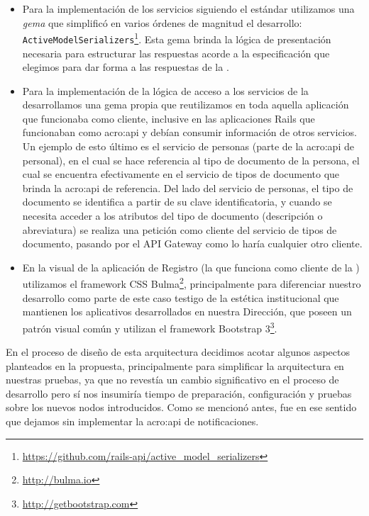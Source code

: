 \begin{itemize}
  \item Para la implementación de los servicios siguiendo el estándar  utilizamos una \textit{gema} que simplificó en varios órdenes de magnitud el desarrollo: \texttt{ActiveModelSerializers}\footnote{\url{https://github.com/rails-api/active_model_serializers}}. Esta gema brinda la lógica de presentación necesaria para estructurar las respuestas acorde a la especificación  que elegimos para dar forma a las respuestas de la {\cloud}.

  \item Para la implementación de la lógica de acceso a los servicios de la {\cloud} desarrollamos una gema propia que reutilizamos en toda aquella aplicación que funcionaba como cliente, inclusive en las aplicaciones Rails que funcionaban como \gls{acro:api} y debían consumir información de otros servicios. Un ejemplo de esto último es el servicio de personas (parte de la \gls{acro:api} de personal), en el cual se hace referencia al tipo de documento de la persona, el cual se encuentra efectivamente en el servicio de tipos de documento que brinda la \gls{acro:api} de referencia. Del lado del servicio de personas, el tipo de documento se identifica a partir de su clave identificatoria, y cuando se necesita acceder a los atributos del tipo de documento (descripción o abreviatura) se realiza una petición como cliente del servicio de tipos de documento, pasando por el API Gateway como lo haría cualquier otro cliente.

  \item En la visual de la aplicación de Registro (la que funciona como cliente de la {\cloud}) utilizamos el framework CSS Bulma\footnote{\url{http://bulma.io}}, principalmente para diferenciar nuestro desarrollo como parte de este caso testigo de la estética institucional que mantienen los aplicativos desarrollados en nuestra Dirección, que poseen un patrón visual común y utilizan el framework Bootstrap 3\footnote{\url{http://getbootstrap.com}}.
\end{itemize}

En el proceso de diseño de esta arquitectura decidimos acotar algunos aspectos planteados en la propuesta, principalmente para simplificar la arquitectura en nuestras pruebas, ya que no revestía un cambio significativo en el proceso de desarrollo pero sí nos insumiría tiempo de preparación, configuración y pruebas sobre los nuevos nodos introducidos. Como se mencionó antes, fue en ese sentido que dejamos sin implementar la \gls{acro:api} de notificaciones.

